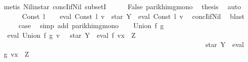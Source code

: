 \begin{isabellebody}
\ {\isacharparenleft}{\kern0pt}metis\ Nil{\isacharunderscore}{\kern0pt}in{\isacharunderscore}{\kern0pt}star\ concI{\isacharunderscore}{\kern0pt}if{\isacharunderscore}{\kern0pt}Nil{}\ subsetI{\isacharparenright}{\kern0pt}\isanewline
\ \ \ \ \isamarkupfalse%
\ False\ parikh{\isacharunderscore}{\kern0pt}img{\isacharunderscore}{\kern0pt}mono\ \isamarkupfalse%
\ {\isacharquery}{\kern0pt}thesis\ \isamarkupfalse%
\ auto\isanewline
\ \ \isamarkupfalse%
\isanewline
{}\isamarkupfalse%
\isanewline
\ \ \isamarkupfalse%
\ {\isacharparenleft}{\kern0pt}Const\ l{\isacharparenright}{\kern0pt}\isanewline
\ \ \isamarkupfalse%
\ {\isachardoublequoteopen}eval\ {\isacharparenleft}{\kern0pt}Const\ l{\isacharparenright}{\kern0pt}\ v\ {\isasymsubseteq}\ star\ Y\ {\isacharat}{\kern0pt}{\isacharat}{\kern0pt}\ eval\ {\isacharparenleft}{\kern0pt}Const\ l{\isacharparenright}{\kern0pt}\ v{\isachardoublequoteclose}\ \isamarkupfalse%
\ concI{\isacharunderscore}{\kern0pt}if{\isacharunderscore}{\kern0pt}Nil{}\ \isamarkupfalse%
\ blast\isanewline
\ \ \isamarkupfalse%
\ \isamarkupfalse%
\ {\isacharquery}{\kern0pt}case\ \isamarkupfalse%
\ {\isacharparenleft}{\kern0pt}simp\ add{\isacharcolon}{\kern0pt}\ parikh{\isacharunderscore}{\kern0pt}img{\isacharunderscore}{\kern0pt}mono{\isacharparenright}{\kern0pt}\isanewline
{}\isamarkupfalse%
\isanewline
\ \ \isamarkupfalse%
\ {\isacharparenleft}{\kern0pt}Union\ f\ g{\isacharparenright}{\kern0pt}\isanewline
\ \ \isamarkupfalse%
\ \isamarkupfalse%
\ {\isachardoublequoteopen}{\isasymPsi}\ {\isacharparenleft}{\kern0pt}eval\ {\isacharparenleft}{\kern0pt}Union\ f\ g{\isacharparenright}{\kern0pt}\ v{\isacharparenright}{\kern0pt}\ {\isasymsubseteq}\ {\isasymPsi}\ {\isacharparenleft}{\kern0pt}star\ Y\ {\isacharat}{\kern0pt}{\isacharat}{\kern0pt}\ eval\ f\ {\isacharparenleft}{\kern0pt}v{\isacharparenleft}{\kern0pt}x\ {\isacharcolon}{\kern0pt}{\isacharequal}{\kern0pt}\ Z{\isacharparenright}{\kern0pt}{\isacharparenright}{\kern0pt}\ {\isasymunion}\isanewline
\ \ \ \ \ \ \ \ \ \ \ \ \ \ \ \ \ \ \ \ \ \ \ \ \ \ \ \ \ \ \ \ \ \ \ \ \ \ \ \ \ \ \ \ \ \ \ \ \ \ \ \ \ \ \ \ \ \ \ \ star\ Y\ {\isacharat}{\kern0pt}{\isacharat}{\kern0pt}\ eval\ g\ {\isacharparenleft}{\kern0pt}v{\isacharparenleft}{\kern0pt}x\ {\isacharcolon}{\kern0pt}{\isacharequal}{\kern0pt}\ Z{\isacharparenright}{\kern0pt}{\isacharparenright}{\kern0pt}{\isacharparenright}{\kern0pt}{\isachardoublequoteclose}\isanewline

\end{isabellebody}

